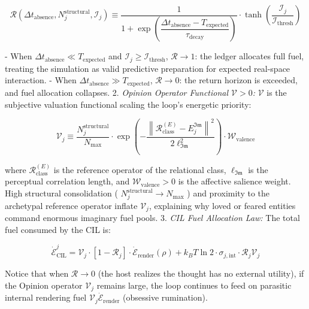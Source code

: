 \documentclass[11pt,a4paper]{article}
\theoremstyle{definition}
\theoremstyle{remark}
\begin{document}
\begin{equation}
\boxed{\mathcal{R}\left(\Delta t_{\text{absence}}, N_j^{\text{structural}}, \mathcal{I}_j\right) \equiv \frac{1}{1 + \exp\left(\dfrac{\Delta t_{\text{absence}} - T_{\text{expected}}}{\tau_{\text{decay}}}\right)} \cdot \tanh\left(\frac{\mathcal{I}_j}{\mathcal{I}_{\text{thresh}}}\right)}
\end{equation}


- When $\Delta t_{\text{absence}} \ll T_{\text{expected}}$ and $\mathcal{I}_j \ge \mathcal{I}_{\text{thresh}}$, $\mathcal{R} \to 1$: the ledger allocates full fuel, treating the simulation as valid predictive preparation for expected real-space interaction.
- When $\Delta t_{\text{absence}} \gg T_{\text{expected}}$, $\mathcal{R} \to 0$: the return horizon is exceeded, and fuel allocation collapses.
2. \textit{Opinion Operator Functional $\mathcal{V} > 0$:} $\mathcal{V}$ is the subjective valuation functional scaling the loop's energetic priority:


\begin{equation}
\boxed{\mathcal{V}_j \equiv \frac{N_j^{\text{structural}}}{N_{\max}} \cdot \exp\left(-\frac{\left\|\mathcal{R}_{\text{class}}^{(E)} - E_j^{\mathfrak{Im}}\right\|^2}{2\ell_{\mathfrak{Im}}^2}\right) \cdot \mathcal{W}_{\text{valence}}}
\end{equation}


where $\mathcal{R}_{\text{class}}^{(E)}$ is the reference operator of the relational class, $\ell_{\mathfrak{Im}}$ is the perceptual correlation length, and $\mathcal{W}_{\text{valence}} > 0$ is the affective salience weight. High structural consolidation ( $N_j^{\text{structural}} \to N_{\max}$ ) and proximity to the archetypal reference operator inflate $\mathcal{V}_j$, explaining why loved or feared entities command enormous imaginary fuel pools.
3. \textit{CIL Fuel Allocation Law:} The total fuel consumed by the CIL is:


\begin{equation}
\boxed{\dot{\mathcal{E}}_{\text{CIL}}^j = \mathcal{V}_j \cdot \left[1 - \mathcal{R}_j\right] \cdot \dot{\mathcal{E}}_{\text{render}}(\rho) + k_B T \ln 2 \cdot \sigma_{j,\text{int}} \cdot \mathcal{R}_j \mathcal{V}_j}
\end{equation}


Notice that when $\mathcal{R} \to 0$ (the host realizes the thought has no external utility), if the Opinion operator $\mathcal{V}_j$ remains large, the loop continues to feed on parasitic internal rendering fuel $\mathcal{V}_j \dot{\mathcal{E}}_{\text{render}}$ (obsessive rumination).
\end{document}
